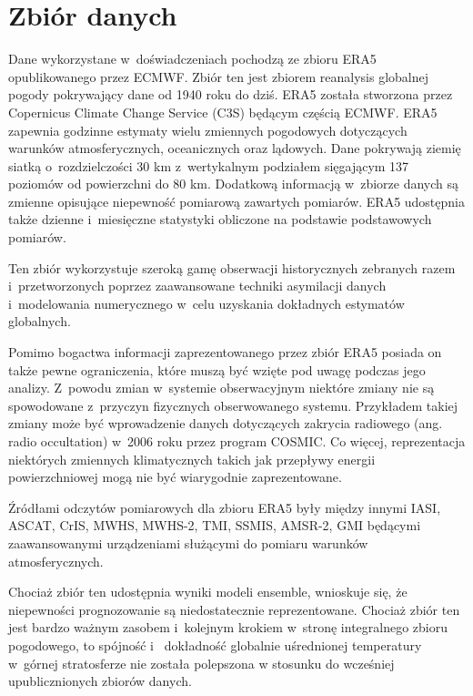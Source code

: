 \section{Zbiór danych}

Dane wykorzystane w~doświadczeniach pochodzą ze zbioru ERA5 opublikowanego przez ECMWF.
Zbiór ten jest zbiorem reanalysis globalnej pogody pokrywający dane od 1940 roku do dziś.
ERA5 została stworzona przez Copernicus Climate Change Service (C3S) będącym częścią ECMWF.
ERA5 zapewnia godzinne estymaty wielu zmiennych pogodowych dotyczących warunków atmosferycznych,
oceanicznych oraz lądowych. Dane pokrywają ziemię siatką o~rozdzielczości 30 km z~wertykalnym podziałem
sięgającym 137 poziomów od powierzchni do 80 km. Dodatkową informacją w~zbiorze danych są zmienne
opisujące niepewność pomiarową zawartych pomiarów. ERA5 udostępnia także dzienne i~miesięczne 
statystyki obliczone na podstawie podstawowych pomiarów.

Ten zbiór wykorzystuje szeroką gamę obserwacji historycznych zebranych razem i~przetworzonych
poprzez zaawansowane techniki asymilacji danych i~modelowania numerycznego w~celu uzyskania 
dokładnych estymatów globalnych.

Pomimo bogactwa informacji zaprezentowanego przez zbiór ERA5 posiada on także pewne 
ograniczenia, które muszą być wzięte pod uwagę podczas jego analizy. Z~powodu zmian w~systemie
obserwacyjnym niektóre zmiany nie są spowodowane z~przyczyn fizycznych obserwowanego systemu.
Przykładem takiej zmiany może być wprowadzenie danych dotyczących zakrycia radiowego (ang.
radio occultation) w~2006 roku przez program COSMIC.
Co więcej, reprezentacja niektórych zmiennych klimatycznych takich jak przepływy energii
powierzchniowej mogą nie być wiarygodnie zaprezentowane.

Źródłami odczytów pomiarowych dla zbioru ERA5 były między innymi IASI, 
ASCAT, CrIS, MWHS, MWHS-2, TMI, SSMIS, AMSR-2, GMI będącymi zaawansowanymi urządzeniami
służącymi do pomiaru warunków atmosferycznych.

Chociaż zbiór ten udostępnia wyniki modeli ensemble, wnioskuje się, że niepewności 
prognozowanie są niedostatecznie  reprezentowane. Chociaż zbiór ten jest bardzo ważnym 
zasobem i~kolejnym krokiem w~stronę integralnego zbioru pogodowego, to spójność i~
dokładność globalnie uśrednionej temperatury w~górnej stratosferze nie została polepszona
w stosunku do wcześniej upublicznionych zbiorów danych.

